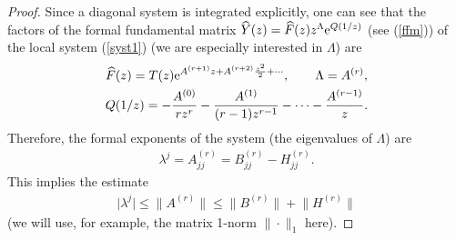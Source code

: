 \documentclass[pdftex]{sigma}
\numberwithin{equation}{section}
\begin{document}
\begin{proof}
Since a diagonal system is integrated explicitly, one can see that the factors of the formal fundamental matrix
$\widehat Y(z)=\widehat F(z) z^{\Lambda}{\rm e}^{Q(1/z)}$ (see (\ref{ffm})) of the local system (\ref{syst1}) (we are
especially interested in $\Lambda$) are
\begin{gather*}
\widehat F(z)=T(z){\rm e}^{A^{(r+1)}z+A^{(r+2)}\frac{z^2}2+\cdots}, \qquad \Lambda=A^{(r)},\\
Q(1/z)=-\frac{A^{(0)}}{rz^r}-\frac{A^{(1)}}{(r-1)z^{r-1}}-\cdots-\frac{A^{(r-1)}}z.
\end{gather*}
Therefore, the formal exponents of the system (the eigenvalues of $\Lambda$) are
\begin{gather*}
\lambda^j=A^{(r)}_{jj}=B^{(r)}_{jj}-H^{(r)}_{jj}.
\end{gather*}
This implies the estimate
\begin{gather*}
\big|\lambda^j\big|\leqslant\big\|A^{(r)}\big\|\leqslant\big\|B^{(r)}\big\|+\big\|H^{(r)}\big\|
\end{gather*}
(we will use, for example, the matrix 1-norm $\|\cdot\|_1$ here).


\end{proof}
\end{document}
